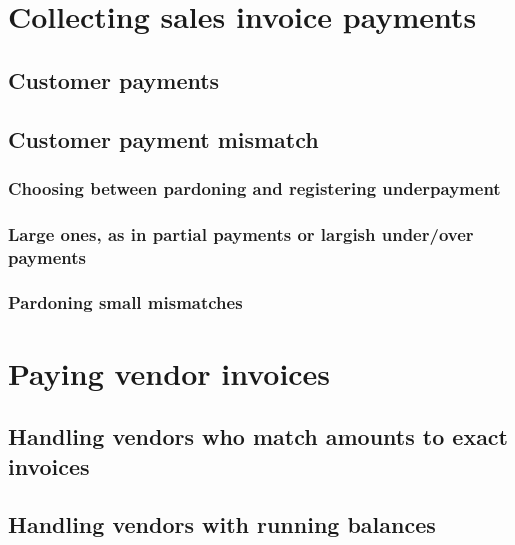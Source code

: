 \chapter{Collecting sales invoice payments}
\label{cha-starting-sales-customer-payments}

\section{Customer payments}
\label{sec-starting-sales-customer-payments}

\section{Customer payment mismatch}
\label{sec-starting-sales-payment-mismatch}

\subsection{Choosing between pardoning and registering underpayment}
\label{subsec-sales-payment-mismatch}

\subsection{Large ones, as in partial payments or largish under/over payments}
\label{subsec-sales-payment-partial}

\subsection{Pardoning small mismatches}
\label{subsec-sales-payment-pardoning}



\chapter{Paying vendor invoices}
\label{cha-starting-vendor-payments}

\section{Handling vendors who match amounts to exact invoices}
\label{sec-vendor-invoice-exact-match}

\section{Handling vendors with running balances}
\label{sec-vendor-invoice-running-balance}

